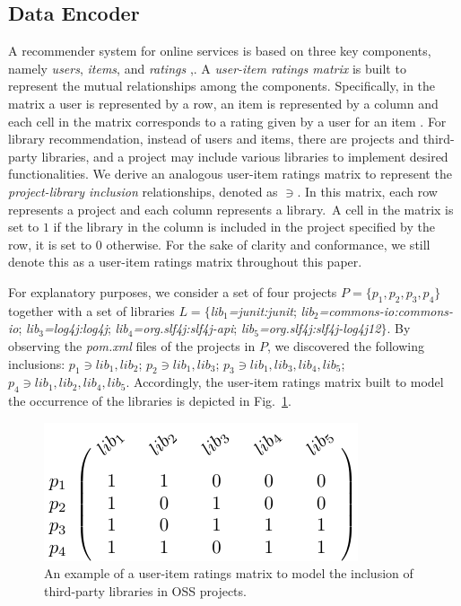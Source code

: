 


\subsection{Data Encoder} \label{sec:DataEncoder}

A recommender system for online services is based on three key components, namely \emph{users}, \emph{items}, and 
\emph{ratings} \cite{Sarwar:2001:ICF:371920.372071},\cite{DBLP:conf/rweb/NoiaO15}. A \emph{user-item ratings matrix} is built 
to represent the mutual relationships among the components. Specifically, in the matrix a user is represented by a row, 
an item is represented by a column and each cell in the matrix corresponds to a rating given by a user for an item 
\cite{DBLP:conf/rweb/NoiaO15}. For library recommendation, instead of users and items, there are projects and 
third-party libraries, and a project may include various libraries to implement desired functionalities.   
We derive an analogous user-item ratings matrix to represent the \emph{project-library inclusion} relationships, 
denoted as $\ni$. In this matrix, each row represents a project and each column represents a library.~A cell in the 
matrix is set to $1$ if the library in the column is included in the project specified by the row,  it is set to $0$ 
otherwise. For the sake of clarity and conformance, we still denote this as a user-item ratings matrix throughout this 
paper.

For explanatory purposes, we consider a set of four projects $P=\{p_1,p_2,p_3,p_4 \}$ together with a set of libraries $L=\{$\emph{lib$_1$=junit:ju\-nit}; \emph{lib$_2$=commons-io:commons-io}; \emph{lib$_3$=log4j:log4j}; \emph{lib$_4$=org.slf4j:slf4j-api}; \emph{lib$_5$=org.slf4j:slf4j-log4j12}$\}$. By observing the \emph{pom.xml} files of the projects in $P$, we discovered the following inclusions: $p_1 \ni lib_1,lib_2$; $p_2 \ni lib_1,lib_3$; $p_3 \ni lib_1,lib_3,lib_4,lib_5$; $p_4 \ni lib_1,lib_2,lib_4,lib_5$. Accordingly, the user-item ratings matrix built to model the occurrence of the libraries is depicted in Fig.~\ref{fig:UserItemMatrix}.

\begin{figure}[h!]
	\centering
	\includegraphics[width=0.7\linewidth]{figs/UserItemMatrix.pdf}
	\caption{An example of a user-item ratings matrix to model the inclusion of third-party libraries in OSS projects.}
	\label{fig:UserItemMatrix}
\end{figure}


